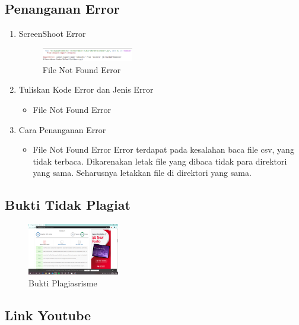 \subsection{Penanganan Error}
\begin{enumerate}
\item ScreenShoot Error
	\begin{figure}[H]
		\includegraphics[width=4cm]{figures/1174053/4/error.png}
		\centering
		\caption{File Not Found Error}
	\end{figure}

	\item Tuliskan Kode Error dan Jenis Error
	\begin{itemize}
		\item File Not Found Error

	\end{itemize}
	\item Cara Penanganan Error
	\begin{itemize}
		\item File Not Found Error
		\hfill\break
		Error terdapat pada kesalahan baca file csv, yang tidak terbaca. Dikarenakan letak file yang dibaca tidak para direktori yang sama. Seharusnya letakkan file di direktori yang sama. 
	\end{itemize}
\end{enumerate}


\subsection{Bukti Tidak Plagiat}
\begin{figure}[H]
	\includegraphics[width=4cm]{figures/1174053/4/plagiarisme.png}
	\centering
	\caption{Bukti Plagiasrisme}
\end{figure}

\subsection{Link Youtube}